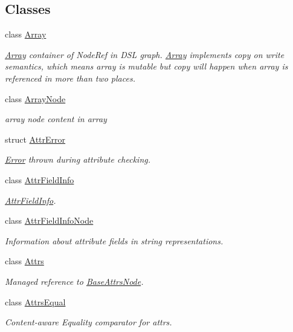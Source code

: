 \subsection*{Classes}
\begin{DoxyCompactItemize}
\item 
class \hyperlink{classtvm_1_1Array}{Array}
\begin{DoxyCompactList}\small\item\em \hyperlink{classtvm_1_1Array}{Array} container of Node\+Ref in D\+SL graph. \hyperlink{classtvm_1_1Array}{Array} implements copy on write semantics, which means array is mutable but copy will happen when array is referenced in more than two places. \end{DoxyCompactList}\item 
class \hyperlink{classtvm_1_1ArrayNode}{Array\+Node}
\begin{DoxyCompactList}\small\item\em array node content in array \end{DoxyCompactList}\item 
struct \hyperlink{structtvm_1_1AttrError}{Attr\+Error}
\begin{DoxyCompactList}\small\item\em \hyperlink{classtvm_1_1Error}{Error} thrown during attribute checking. \end{DoxyCompactList}\item 
class \hyperlink{classtvm_1_1AttrFieldInfo}{Attr\+Field\+Info}
\begin{DoxyCompactList}\small\item\em \hyperlink{classtvm_1_1AttrFieldInfo}{Attr\+Field\+Info}. \end{DoxyCompactList}\item 
class \hyperlink{classtvm_1_1AttrFieldInfoNode}{Attr\+Field\+Info\+Node}
\begin{DoxyCompactList}\small\item\em Information about attribute fields in string representations. \end{DoxyCompactList}\item 
class \hyperlink{classtvm_1_1Attrs}{Attrs}
\begin{DoxyCompactList}\small\item\em Managed reference to \hyperlink{classtvm_1_1BaseAttrsNode}{Base\+Attrs\+Node}. \end{DoxyCompactList}\item 
class \hyperlink{classtvm_1_1AttrsEqual}{Attrs\+Equal}
\begin{DoxyCompactList}\small\item\em Content-\/aware Equality comparator for attrs. \end{DoxyCompactList}\item 

\end{DoxyCompactItemize}

